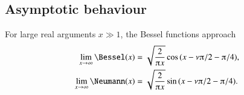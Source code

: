     \subsection{Asymptotic behaviour}
    For large real arguments $x\gg 1$, the Bessel functions approach
    \begin{subequations}\label{eq:cylinder:prop:JacobiAnger}
        \begin{align}
            \lim_{x\to \infty} \Bessel(x) &=
            \sqrt{\frac{2}{\ppi x}} \cos{(x - \nu \ppi/2 - \ppi/4)}, \label{eq:cylinder:prop:JacobiAnger_sin}  \\
            \lim_{x\to \infty} \Neumann(x) &=
            \sqrt{\frac{2}{\ppi x}} \sin{(x - \nu \ppi/2 - \ppi/4)}.\label{eq:cylinder:prop:JacobiAnger_cos} 
        \end{align}
    \end{subequations}


